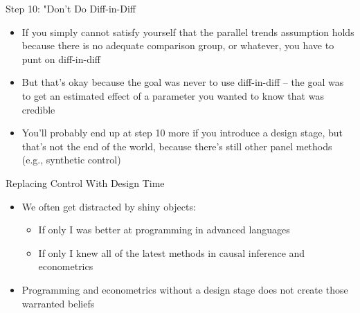 \documentclass{beamer}
\begin{document}
\begin{frame}{Step 10: "Don't Do Diff-in-Diff}

\begin{itemize}
\item If you simply cannot satisfy yourself that the parallel trends assumption holds because there is no adequate comparison group, or whatever, you have to punt on diff-in-diff
\item But that's okay because the goal was never to use diff-in-diff -- the goal was to get an estimated effect of a parameter you wanted to know that was credible
\item You'll probably end up at step 10 more if you introduce a design stage, but that's not the end of the world, because there's still other panel methods (e.g., synthetic control)


\end{itemize}

\end{frame}

\begin{frame}{Replacing Control With Design Time}

\begin{itemize}
\item We often get distracted by shiny objects:
	\begin{itemize}
	\item If only I was better at programming in advanced languages
	\item If only I knew all of the latest methods in causal inference and econometrics
	\end{itemize}
\item Programming and econometrics without a design stage does not create those warranted beliefs
\end{itemize}

\end{frame}
\end{document}
